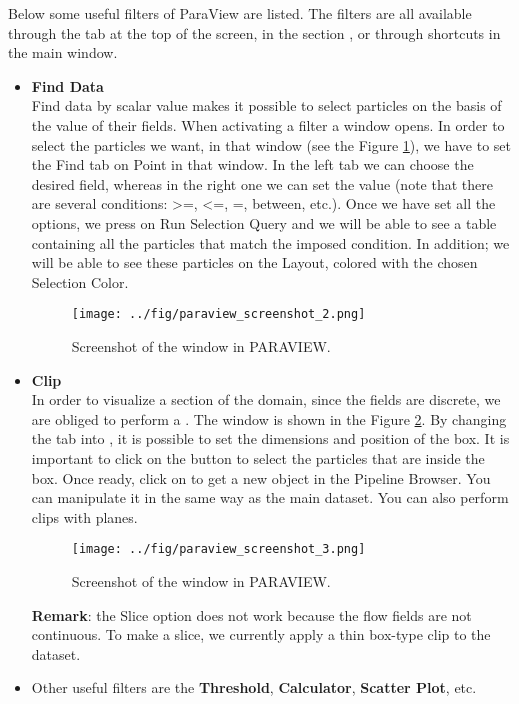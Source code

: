 \documentclass{../GPUSPHtemplate}
\begin{document}
Below some useful filters of ParaView are listed. The filters are all available 
through the  tab at the top of the screen, in the section
, or through shortcuts in the main window.\\
\begin{itemize} 
\item \textbf{Find Data}\\
Find data by scalar value makes it possible to select particles 
on the basis of the value of their fields. When activating a filter
a window opens. In order to select the particles we want, 
in that window (see the Figure \ref{fig:paraview_screenshot_2}),
we have to set the Find tab on Point in that window. 
In the left tab we can choose the desired field, whereas in the right one 
we can set the value (note that there are several conditions: >=, <=, =, between, etc.). 
Once we have set all the options, we press on Run Selection Query and we 
will be able to see a table containing all the particles that match 
the imposed condition. 
In addition; we will be able to see these particles on 
the Layout, colored with the chosen Selection Color.
\begin{figure}[h]
  \begin{center}
    \texttt{[image: ../fig/paraview\_screenshot\_2.png]}
    \caption{Screenshot of the  window in PARAVIEW.}\label{fig:paraview_screenshot_2}   
  \end{center}
\end{figure}

\item \textbf{Clip} \\
In order to visualize a section of the domain, 
since the fields are discrete, we are obliged to perform a .
The  window is shown in the Figure \ref{fig:paraview_screenshot_3}.  
By changing the  tab into , it is possible to set the dimensions 
and position of the box. It is important to click on the  button 
to select the particles that are inside the box. Once ready, click on 
 to get a new  object in the Pipeline Browser.
You can manipulate it in the same way as the main dataset. You can
also perform clips with planes. \\
\begin{figure}[h]
  \begin{center}
    \texttt{[image: ../fig/paraview\_screenshot\_3.png]}
    \caption{Screenshot of the  window in PARAVIEW.}\label{fig:paraview_screenshot_3}   
  \end{center}
\end{figure}
\textbf{Remark}: the Slice option does not work because the flow fields are not continuous.
To make a slice, we currently apply a thin box-type clip to the dataset.\\

\item Other useful filters are the \textbf{Threshold}, \textbf{Calculator}, \textbf{Scatter Plot}, etc.

\end{itemize}
\end{document}
